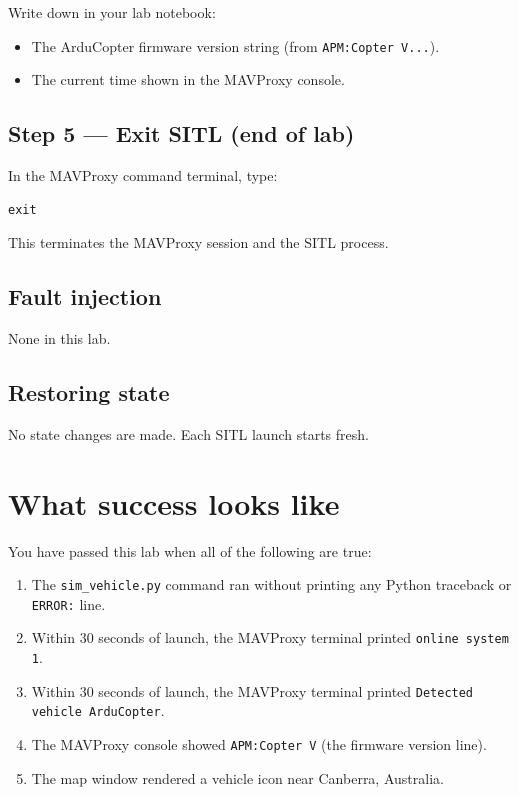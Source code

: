 \documentclass[a4paper,11pt,twoside]{article}
\begin{document}
Write down in your lab notebook:
\begin{itemize}
  \item The ArduCopter firmware version string (from \texttt{APM:Copter V...}).
  \item The current time shown in the MAVProxy console.
\end{itemize}

\subsection*{Step 5 --- Exit SITL (end of lab)}

In the MAVProxy command terminal, type:

\begin{Verbatim}[frame=single,fontsize=\small]
exit
\end{Verbatim}

This terminates the MAVProxy session and the SITL process.

\subsection*{Fault injection}

None in this lab.

\subsection*{Restoring state}

No state changes are made. Each SITL launch starts fresh.

\section*{What success looks like}

You have passed this lab when all of the following are true:
\begin{enumerate}
  \item The \texttt{sim\_vehicle.py} command ran without printing any Python traceback or \texttt{ERROR:} line.
  \item Within 30 seconds of launch, the MAVProxy terminal printed \texttt{online system 1}.
  \item Within 30 seconds of launch, the MAVProxy terminal printed \texttt{Detected vehicle ArduCopter}.
  \item The MAVProxy console showed \texttt{APM:Copter V} (the firmware version line).
  \item The map window rendered a vehicle icon near Canberra, Australia.
\end{enumerate}
\end{document}
